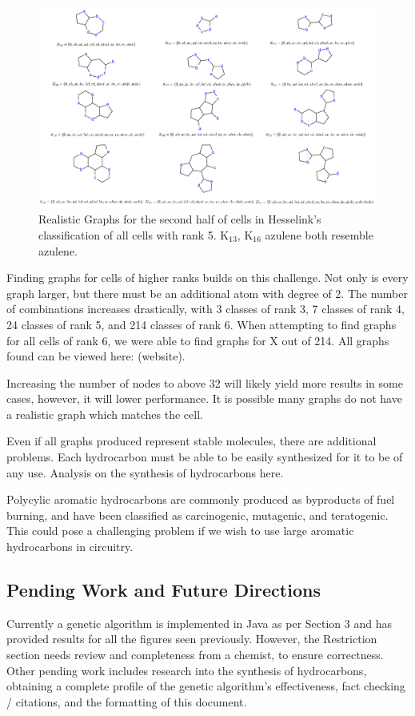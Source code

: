 \documentclass[12pt]{article}
\begin{document}
\begin{figure}[ht!]
\centering
\includegraphics[width=160mm]{rank5Results2.png}
\caption{Realistic Graphs for the second half of cells in Hesselink's classification of all cells with rank 5. K$_{13}$, K$_{16}$ azulene both resemble azulene.}
\label{fig:rank5Results2}
\end{figure}

Finding graphs for cells of higher ranks builds on this challenge. Not only is every graph larger, but there must be an additional atom with degree of 2. The number of combinations increases drastically, with 3 classes of rank 3, 7 classes of rank 4, 24 classes of rank 5, and 214 classes of rank 6. When attempting to find graphs for all cells of rank 6, we were able to find graphs for X out of 214. All graphs found can be viewed here: (website).

Increasing the number of nodes to above 32 will likely yield more results in some cases, however, it will lower performance. It is possible many graphs do not have a realistic graph which matches the cell.

Even if all graphs produced represent stable molecules, there are additional problems. Each hydrocarbon must be able to be easily synthesized for it to be of any use. Analysis on the synthesis of hydrocarbons here.

Polycylic aromatic hydrocarbons are commonly produced as byproducts of fuel burning, and have been classified as carcinogenic, mutagenic, and teratogenic. This could pose a challenging problem if we wish to use large aromatic hydrocarbons in circuitry. 

\subsection{Pending Work and Future Directions}
Currently a genetic algorithm is implemented in Java as per Section 3 and has provided results for all the figures seen previously. However, the Restriction section needs review and completeness from a chemist, to ensure correctness. Other pending work includes research into the synthesis of hydrocarbons, obtaining a complete profile of the genetic algorithm's effectiveness, fact checking / citations, and the formatting of this document.
\end{document}
